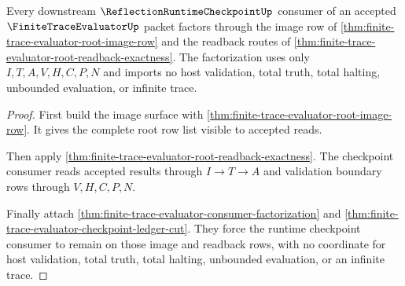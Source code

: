 \begin{theorem}
\label{thm:finite-trace-evaluator-root-ledger-factorization}
Every downstream $\ReflectionRuntimeCheckpointUp$ consumer of an accepted
$\FiniteTraceEvaluatorUp$ packet factors through the image row of
\autoref{thm:finite-trace-evaluator-root-image-row} and the readback routes of
\autoref{thm:finite-trace-evaluator-root-readback-exactness}. The factorization
uses only $I,T,A,V,H,C,P,N$ and imports no host validation, total truth, total
halting, unbounded evaluation, or infinite trace.
\end{theorem}
\begin{proof}
First build the image surface with
\autoref{thm:finite-trace-evaluator-root-image-row}. It gives the complete root
row list visible to accepted reads.

Then apply \autoref{thm:finite-trace-evaluator-root-readback-exactness}. The
checkpoint consumer reads accepted results through $I \to T \to A$ and
validation boundary rows through $V,H,C,P,N$.

Finally attach \autoref{thm:finite-trace-evaluator-consumer-factorization} and
\autoref{thm:finite-trace-evaluator-checkpoint-ledger-cut}. They force the
runtime checkpoint consumer to remain on those image and readback rows, with no
coordinate for host validation, total truth, total halting, unbounded
evaluation, or an infinite trace.
\end{proof}
